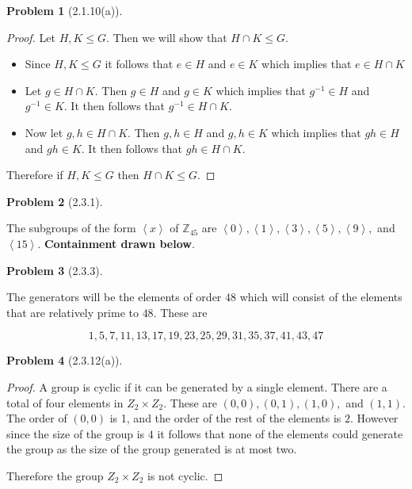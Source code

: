 \documentclass[10pt]{article}
\newcommand{\sk}{\vskip 10mm}
\newcommand{\bb}[1]{\mathbb{#1}}
\theoremstyle{plain}
\newtheorem{problem}{Problem}
\theoremstyle{remark}
\begin{document}
\sk

\begin{problem}[2.1.10(a)]
  
\end{problem}

\begin{proof}
  Let $H,K\leq G$. Then we will show that $H\cap K\leq G$.
  \begin{itemize}
  \item Since $H,K\leq G$ it follows that $e\in H$ and $e\in K$ which
    implies that $e\in H\cap K$
  \item Let $g\in H\cap K$. Then $g\in H$ and $g\in K$ which implies that
    $g^{-1}\in H$ and $g^{-1}\in K$. It then follows that $g^{-1}\in H\cap K$.
  \item Now let $g,h\in H\cap K$. Then $g,h\in H$ and $g,h\in K$ which implies
    that $gh\in H$ and $gh\in K$. It then follows that $gh\in H\cap K$.
  \end{itemize}

  Therefore if $H,K\leq G$ then $H\cap K\leq G$.
\end{proof}

\sk

\begin{problem}[2.3.1]
  
\end{problem}

The subgroups of the form $\left<x\right>$ of $\bb{Z}_{45}$ are
$\left<0\right>,\left<1\right>,\left<3\right>,\left<5\right>,\left<9\right>,$
and $\left<15\right>$. \textbf{Containment drawn below}.

\vskip 3in

\begin{problem}[2.3.3]
  
\end{problem}

The generators will be the elements of order $48$ which will consist of
the elements that are relatively prime to $48$. These are

\[ 1, 5, 7, 11, 13, 17, 19, 23, 25, 29, 31, 35, 37, 41, 43, 47 \]

\sk

\begin{problem}[2.3.12(a)]
  
\end{problem}

\begin{proof}
  A group is cyclic if it can be generated by a single element.
  There are a total of four elements in $Z_2\times Z_2$. These are
  $(0,0),(0,1),(1,0),$ and $(1,1)$. The order of $(0,0)$ is 1,
  and the order of the rest of the elements is $2$. However since
  the size of the group is $4$ it follows that none of the elements
  could generate the group as the size of the group generated is at
  most two.

  Therefore the group $Z_2\times Z_2$ is not cyclic.
\end{proof}

\end{document}

